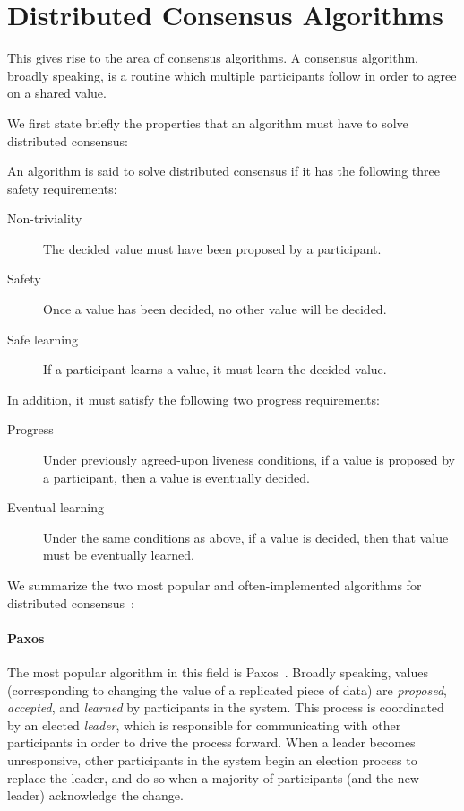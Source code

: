 \section{Distributed Consensus Algorithms}

This gives rise to the area of consensus algorithms. A consensus algorithm,
broadly speaking, is a routine which multiple participants follow in order to
agree on a shared value.

We first state briefly the properties that an algorithm must have to solve
distributed consensus:
\begin{definition}
  \label{def:consensus}
  An algorithm is said to solve distributed consensus if it has the following
  three safety requirements:
  \begin{description}
    \item[Non-triviality] The decided value must have been proposed by a
      participant.
    \item[Safety] Once a value has been decided, no other value will be decided.
    \item[Safe learning] If a participant learns a value, it must learn the
      decided value.
  \end{description}
  In addition, it must satisfy the following two progress requirements:
  \begin{description}
    \item[Progress] Under previously agreed-upon liveness conditions, if a value
      is proposed by a participant, then a value is eventually decided.
    \item[Eventual learning] Under the same conditions as above, if a value is
      decided, then that value must be eventually learned.
  \end{description}
\end{definition}

We summarize the two most popular and often-implemented algorithms for
distributed consensus~\citep{howard20}:

\paragraph{Paxos}
The most popular algorithm in this field is Paxos~\citep{lamport98}. Broadly
speaking, values (corresponding to changing the value of a replicated piece of
data) are \textit{proposed}, \textit{accepted}, and \textit{learned} by
participants in the system. This process is coordinated by an elected
\textit{leader}, which is responsible for communicating with other participants
in order to drive the process forward. When a leader becomes unresponsive, other
participants in the system begin an election process to replace the leader, and
do so when a majority of participants (and the new leader) acknowledge the
  change.

